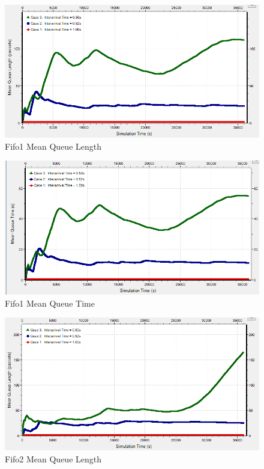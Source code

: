 \documentclass{article}
\begin{document}
\begin{figure}[h!]
	\begin{center}
	\includegraphics[scale=0.75]{Images/Fifo1_QueueLength.PNG}
	\vspace{-.25cm}
	\caption{Fifo1 Mean Queue Length}
	\label{fifo1_qlen}
	\end{center}
\end{figure}

\begin{figure}[h!]
	\begin{center}
	\includegraphics[scale=0.75]{Images/Fifo1_QueueTime.PNG}
	\vspace{-.25cm}
	\caption{Fifo1 Mean Queue Time}
	\label{fifo1_qtime}
	\end{center}
\end{figure}

\begin{figure}[h!]
	\begin{center}
	\includegraphics[scale=0.75]{Images/Fifo2_QueueLength.PNG}
	\vspace{-.25cm}
	\caption{Fifo2 Mean Queue Length}
	\label{fifo2_qlen}
	\end{center}
\end{figure}
\end{document}
